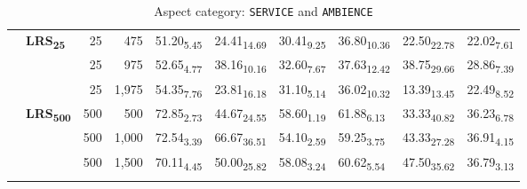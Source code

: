 \begin{table}[H]
\begin{subtable}{\linewidth}
{\begin{tabular}{llrrllllll}
\arrayrulecolor{gray}\cline{2-10}\arrayrulecolor{black}
\hline
\multirow{6}{*}{\textbf{GPT-3.5-turbo}} & \multirow{3}{*}{\textbf{LRS\textsubscript{25}}} & 25 & 475 & 51.20\textsubscript{5.45} & 24.41\textsubscript{14.69} & 30.41\textsubscript{9.25} & 36.80\textsubscript{10.36} & 22.50\textsubscript{22.78} & 22.02\textsubscript{7.61} \\
 &  & 25 & 975 & 52.65\textsubscript{4.77} & 38.16\textsubscript{10.16} & 32.60\textsubscript{7.67} & 37.63\textsubscript{12.42} & 38.75\textsubscript{29.66} & 28.86\textsubscript{7.39} \\
 &  & 25 & 1,975 & 54.35\textsubscript{7.76} & 23.81\textsubscript{16.18} & 31.10\textsubscript{5.14} & 36.02\textsubscript{10.32} & 13.39\textsubscript{13.45} & 22.49\textsubscript{8.52} \\
\arrayrulecolor{gray}\cline{2-10}\arrayrulecolor{black}
 & \multirow{3}{*}{\textbf{LRS\textsubscript{500}}} & 500 & 500 & 72.85\textsubscript{2.73} & 44.67\textsubscript{24.55} & 58.60\textsubscript{1.19} & 61.88\textsubscript{6.13} & 33.33\textsubscript{40.82} & 36.23\textsubscript{6.78} \\
 &  & 500 & 1,000 & 72.54\textsubscript{3.39} & 66.67\textsubscript{36.51} & 54.10\textsubscript{2.59} & 59.25\textsubscript{3.75} & 43.33\textsubscript{27.28} & 36.91\textsubscript{4.15} \\
 &  & 500 & 1,500 & 70.11\textsubscript{4.45} & 50.00\textsubscript{25.82} & 58.08\textsubscript{3.24} & 60.62\textsubscript{5.54} & 47.50\textsubscript{35.62} & 36.79\textsubscript{3.13} \\
\arrayrulecolor{gray}\cline{2-10}\arrayrulecolor{black}
\hline
\end{tabular}
}
\caption{Aspect category: \texttt{SERVICE} and \texttt{AMBIENCE}}
\end{subtable}
\begin{subtable}{\linewidth}
\vspace{0.3cm}
\renewcommand{\arraystretch}{1.0}
\setlength{\tabcolsep}{0.1cm}
\centering
{}
\end{subtable}
\end{table}
